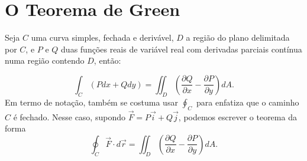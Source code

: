 \section{O Teorema de Green}
\begin{teo}
 Seja $C$ uma curva simples, fechada e derivável, $D$ a região do plano delimitada por $C$, e $P$ e $Q$ duas funções reais de variável real com derivadas parciais contínua numa região contendo $D$, então:

$$\int_{C} (P dx + Q dy) = \iint_{D} \left(\frac{\partial Q}{\partial x} - \frac{\partial P}{\partial
y}\right) dA.
$$
Em termo de notação, também se costuma usar $\oint_C$ para enfatiza que o caminho $C$ é fechado. Nesse caso, supondo $\vec{F}=P\vec{i}+Q\vec{j}$, podemos escrever o teorema da forma
$$
\oint_C  \vec{F} \cdot d\vec{r}=\iint_{D} \left(\frac{\partial Q}{\partial x} - \frac{\partial P}{\partial
y}\right) dA.
$$
\end{teo}


